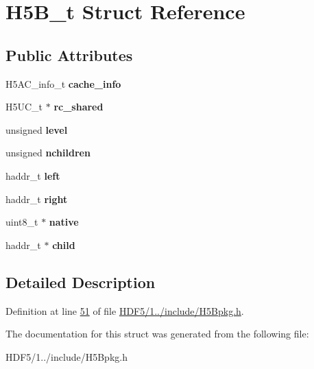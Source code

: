 \hypertarget{struct_h5_b__t}{}\section{H5\+B\+\_\+t Struct Reference}
\label{struct_h5_b__t}
\subsection*{Public Attributes}
\begin{DoxyCompactItemize}
\item 
\mbox{\label{struct_h5_b__t_a9dabd69f5c1d6bf56e37d74c1da46ff7}} 
H5\+A\+C\+\_\+info\+\_\+t {\bfseries cache\+\_\+info}
\item 
\mbox{\label{struct_h5_b__t_a6f215f62f009b665f14783d8e5222114}} 
H5\+U\+C\+\_\+t $\ast$ {\bfseries rc\+\_\+shared}
\item 
\mbox{\label{struct_h5_b__t_a6bf8e8202bf391c68ef37148fe763ccc}} 
unsigned {\bfseries level}
\item 
\mbox{\label{struct_h5_b__t_af9dc218cf6c79868f875904af80b30ed}} 
unsigned {\bfseries nchildren}
\item 
\mbox{\label{struct_h5_b__t_a8f086a7ec26b34ce65fd87c606088460}} 
haddr\+\_\+t {\bfseries left}
\item 
\mbox{\label{struct_h5_b__t_a0a3af81d6d8214100bc57465935c2d08}} 
haddr\+\_\+t {\bfseries right}
\item 
\mbox{\label{struct_h5_b__t_abc632cac15cb7615e18992418b1fc51b}} 
uint8\+\_\+t $\ast$ {\bfseries native}
\item 
\mbox{\label{struct_h5_b__t_af123d516f42264539bc644a3149cd705}} 
haddr\+\_\+t $\ast$ {\bfseries child}
\end{DoxyCompactItemize}


\subsection{Detailed Description}


Definition at line \hyperlink{_h_d_f5_21_810_81_2include_2_h5_bpkg_8h_source_l00051}{51} of file \hyperlink{_h_d_f5_21_810_81_2include_2_h5_bpkg_8h_source}{H\+D\+F5/1../include/\+H5\+Bpkg.\+h}.



The documentation for this struct was generated from the following file\+:\begin{DoxyCompactItemize}
\item 
H\+D\+F5/1../include/\+H5\+Bpkg.\+h\end{DoxyCompactItemize}
